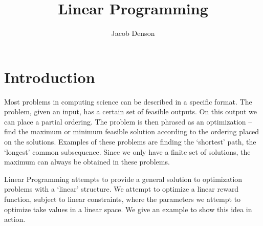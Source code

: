 

\title{Linear Programming}
\author{Jacob Denson}


    \maketitle

    \chapter{Introduction}

    Most problems in computing science can be described in a specific format. The problem, given an input, has a certain set of feasible outputs. On this output we can place a partial ordering. The problem is then phrased as an optimization -- find the maximum or minimum feasible solution according to the ordering placed on the solutions. Examples of these problems are finding the `shortest' path, the `longest' common subsequence. Since we only have a finite set of solutions, the maximum can always be obtained in these problems.

    Linear Programming attempts to provide a general solution to optimization problems with a `linear' structure. We attempt to optimize a linear reward function, subject to linear constraints, where the parameters we attempt to optimize take values in a linear space. We give an example to show this idea in action.

